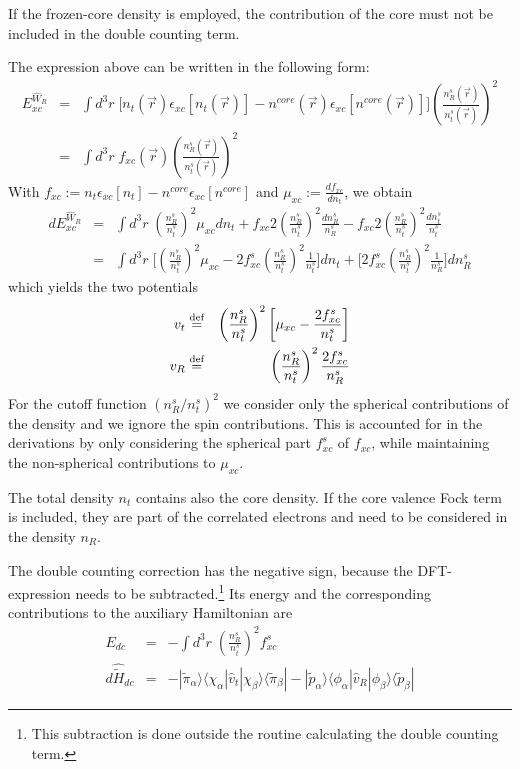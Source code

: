 \documentclass[11pt,a4paper]{report}
\begin{document}
If the frozen-core density is employed, the contribution of the core
must not be included in the double counting term.

The expression above can be written in the
following form:
\begin{eqnarray}
E_{xc}^{\hat{W}_R}&=&
\int d^3r\; 
\biggl[
n_t(\vec{r})
\epsilon_{xc}[n_t(\vec{r})]
-n^{core}(\vec{r})
\epsilon_{xc}[n^{core}(\vec{r})]
\biggr]
\left(\frac{n^s_R(\vec{r})}{n^s_t(\vec{r})}\right)^2
\nonumber\\
&=&
\int d^3r\; f_{xc}(\vec{r})
\left(\frac{n^s_R(\vec{r})}{n^s_t(\vec{r})}\right)^2
\end{eqnarray}
With $f_{xc}:=n_t\epsilon_{xc}[n_t]-n^{core}\epsilon_{xc}[n^{core}]$ and
$\mu_{xc}:=\frac{df_{xc}}{dn_t}$, we obtain
\begin{eqnarray}
dE_{xc}^{\hat{W}_R}
&=&\int d^3r\; 
\left(\frac{n^s_R}{n^s_t}\right)^2\mu_{xc} dn_t
+f_{xc}2\left(\frac{n^s_R}{n^s_t}\right)^2\frac{dn^s_R}{n^s_R}
-f_{xc}2\left(\frac{n^s_R}{n^s_t}\right)^2\frac{dn^s_t}{n^s_t}
\nonumber\\
&=&\int d^3r\; 
\biggl[
\left(\frac{n^s_R}{n^s_t}\right)^2\mu_{xc} 
-2f^s_{xc}\left(\frac{n^s_R}{n^s_t}\right)^2\frac{1}{n^s_t}\biggr]dn_t
+\biggl[2f^s_{xc}\left(\frac{n^s_R}{n^s_t}\right)^2\frac{1}{n^s_R}\biggr] dn^s_R
\end{eqnarray}
which yields the two potentials
\begin{eqnarray}
v_t&\stackrel{\text{def}}{=}&\left(\frac{n^s_R}{n^s_t}\right)^2
\biggl[\mu_{xc} -\frac{2f^s_{xc}}{n^s_t}\biggr]
\nonumber\\
v_R&\stackrel{\text{def}}{=}&\left(\frac{n^s_R}{n^s_t}\right)^2\frac{2f^s_{xc}}{n^s_R}
\end{eqnarray}
For the cutoff function $(n^s_R/n^s_t)^2$ we consider only the
spherical contributions of the density and we ignore the spin
contributions. This is accounted for in the derivations by only
considering the spherical part $f^s_{xc}$ of $f_{xc}$, while
maintaining the non-spherical contributions to $\mu_{xc}$.

The total density $n_t$ contains also the core density. If the core
valence Fock term is included, they are part of the correlated
electrons and need to be considered in the density $n_R$.

The double counting correction has the negative sign, because the
DFT-expression needs to be subtracted.\footnote{This subtraction is
  done outside the routine calculating the double counting term.}  Its
energy and the corresponding contributions to the auxiliary
Hamiltonian are
\begin{eqnarray}
E_{dc}&=&-\int d^3r\; \left(\frac{n^s_R}{n^s_t}\right)^2f^s_{xc}
\nonumber\\
d\hat{\tilde{H}}_{dc}&=&
-|\tilde{\pi}_\alpha\rangle\langle\chi_\alpha|\hat{v}_t|\chi_\beta\rangle
\langle\tilde{\pi}_\beta|
-|\tilde{p}_\alpha\rangle
\langle\phi_\alpha|\hat{v}_R|\phi_\beta\rangle
\langle\tilde{p}_\beta|
\end{eqnarray}
\end{document}
